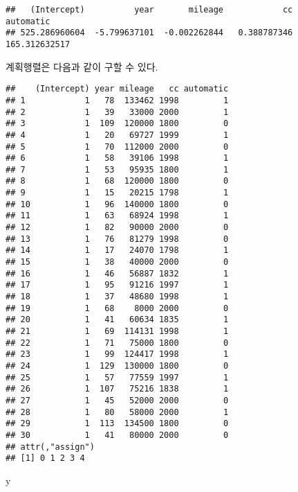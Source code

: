 \documentclass[
]{book}
\newenvironment{Shaded}{\begin{snugshade}}{\end{snugshade}}
\newcommand{\FunctionTok}[1]{\textcolor[rgb]{0.00,0.00,0.00}{#1}}
\newcommand{\NormalTok}[1]{#1}
\newcommand{\OtherTok}[1]{\textcolor[rgb]{0.56,0.35,0.01}{#1}}
\newcommand{\SpecialCharTok}[1]{\textcolor[rgb]{0.00,0.00,0.00}{#1}}
\begin{document}
\begin{verbatim}
##   (Intercept)          year       mileage            cc     automatic 
## 525.286960604  -5.799637101  -0.002262844   0.388787346 165.312632517
\end{verbatim}

계획행렬은 다음과 같이 구할 수 있다.

\begin{Shaded}
\end{Shaded}

\begin{verbatim}
##    (Intercept) year mileage   cc automatic
## 1            1   78  133462 1998         1
## 2            1   39   33000 2000         1
## 3            1  109  120000 1800         0
## 4            1   20   69727 1999         1
## 5            1   70  112000 2000         0
## 6            1   58   39106 1998         1
## 7            1   53   95935 1800         1
## 8            1   68  120000 1800         0
## 9            1   15   20215 1798         1
## 10           1   96  140000 1800         0
## 11           1   63   68924 1998         1
## 12           1   82   90000 2000         0
## 13           1   76   81279 1998         0
## 14           1   17   24070 1798         1
## 15           1   38   40000 2000         0
## 16           1   46   56887 1832         1
## 17           1   95   91216 1997         1
## 18           1   37   48680 1998         1
## 19           1   68    8000 2000         0
## 20           1   41   60634 1835         1
## 21           1   69  114131 1998         1
## 22           1   71   75000 1800         0
## 23           1   99  124417 1998         1
## 24           1  129  130000 1800         0
## 25           1   57   77559 1997         1
## 26           1  107   75216 1838         1
## 27           1   45   52000 2000         0
## 28           1   80   58000 2000         1
## 29           1  113  134500 1800         0
## 30           1   41   80000 2000         0
## attr(,"assign")
## [1] 0 1 2 3 4
\end{verbatim}

\begin{Shaded}
\begin{Highlighting}[]
\NormalTok{y}
\end{Highlighting}
\end{Shaded}
\end{document}
